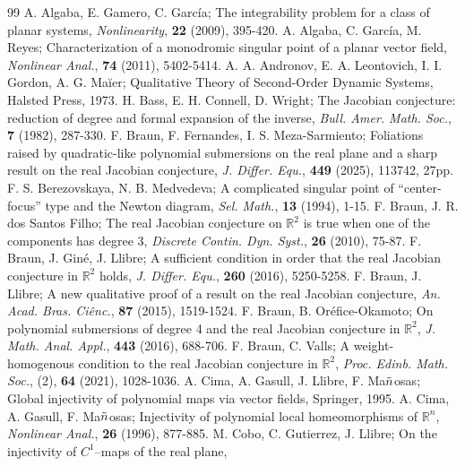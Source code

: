 \documentclass[10pt,a4paper]{amsart}
\numberwithin{equation}{section}
\begin{document}
\begin{thebibliography}{99}
 A. Algaba, E. Gamero, C. Garc\'ia;
The integrability problem for a class of planar systems,
\emph{Nonlinearity}, \textbf{22} (2009), 395-420.
 A. Algaba, C. Garc\'ia, M. Reyes;
Characterization of a monodromic singular point of a planar vector field,
\emph{Nonlinear Anal.}, \textbf{74} (2011), 5402-5414.
 A. A. Andronov, E. A. Leontovich, I. I. Gordon, A. G. Ma\u{i}er;
Qualitative Theory of Second-Order Dynamic Systems, Halsted Press, 1973.
 H. Bass, E. H. Connell, D. Wright;
The Jacobian conjecture: reduction of degree and formal expansion of the inverse,
\emph{Bull. Amer. Math. Soc.}, \textbf{7} (1982), 287-330.
 F. Braun, F. Fernandes, I. S. Meza-Sarmiento;
Foliations raised by quadratic-like polynomial submersions on the real plane and a sharp result on the real Jacobian conjecture,
\emph{J. Differ. Equ.}, \textbf{449} (2025), 113742, 27pp.
 F. S. Berezovskaya, N. B. Medvedeva;
A complicated singular point of “center-focus” type and the Newton diagram,
\emph{Sel. Math.}, \textbf{13} (1994), 1-15.
 F. Braun, J. R. dos Santos Filho;
The real Jacobian conjecture on $\mathbb{R}^2$ is true when one of the components has degree 3,
\emph{Discrete Contin. Dyn. Syst.}, \textbf{26} (2010), 75-87.
 F. Braun, J. Gin\'{e}, J. Llibre;
A sufficient condition in order that the real Jacobian conjecture in $\mathbb{R}^2$ holds,
\emph{J. Differ. Equ.}, \textbf{260} (2016), 5250-5258.
 F. Braun, J. Llibre;
A new qualitative proof of a result on the real Jacobian conjecture,
\emph{An. Acad. Bras. Ci\^{e}nc.}, \textbf{87} (2015), 1519-1524.
 F. Braun, B. Or\'{e}fice-Okamoto;
On polynomial submersions of degree 4 and the real Jacobian conjecture in $\mathbb{R}^2$,
\emph{J. Math. Anal. Appl.}, \textbf{443} (2016), 688-706.
 F. Braun, C. Valls;
A weight-homogenous condition to the real Jacobian conjecture in $\mathbb{R}^2$,
\emph{Proc. Edinb. Math. Soc.}, (2), \textbf{64} (2021), 1028-1036.
 A. Cima, A. Gasull, J. Llibre, F. Ma$\Tilde{\rm n}$osas;
Global injectivity of polynomial maps via vector fields, Springer, 1995.
 A. Cima, A. Gasull, F. Ma$\Tilde{\rm n}$osas;
Injectivity of polynomial local homeomorphisms of $\mathbb{R}^n$,
\emph{Nonlinear Anal.}, \textbf{26} (1996), 877-885.
 M. Cobo, C. Gutierrez, J. Llibre;
On the injectivity of $C^1$–maps of the real plane,

\end{thebibliography}
\end{document}
